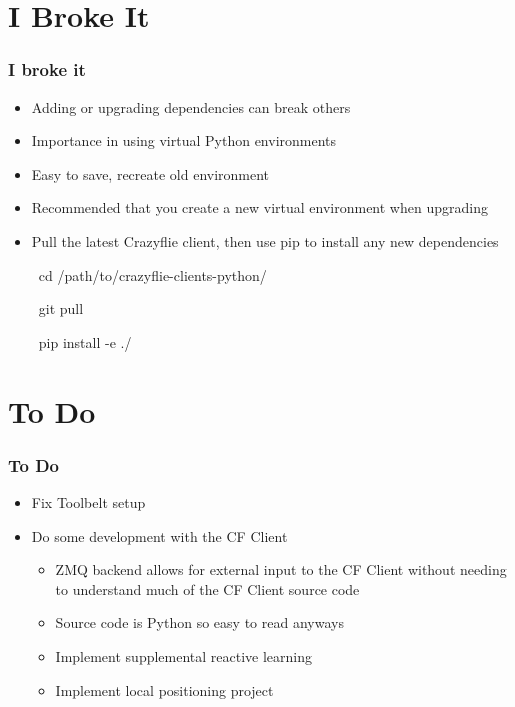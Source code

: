 \documentclass[t, xcolor=dvipsnames]{beamer} %
\begin{document}
\section{I Broke It}
\begin{frame}
	\frametitle{I broke it}
	\begin{itemize}
		\item Adding or upgrading dependencies can break others
		\item Importance in using virtual Python environments
		\item Easy to save, recreate old environment
		\item Recommended that you create a new virtual environment when upgrading
		\item Pull the latest Crazyflie client, then use pip to install any new dependencies
			\begin{semiverbatim}
			\ cd /path/to/crazyflie-clients-python/
			\end{semiverbatim}
			\begin{semiverbatim}
			\ git pull
			\end{semiverbatim}
			\begin{semiverbatim}
			\ pip install -e ./
			\end{semiverbatim}
      \end{itemize}
\end{frame}

\section{To Do}
\begin{frame}
	\frametitle{To Do}
	\begin{itemize}
		\item Fix Toolbelt setup
		\item Do some development with the CF Client
		\begin{itemize}
			\item ZMQ backend allows for external input to the CF Client without needing to understand much of the CF Client source code
			\item Source code is Python so easy to read anyways
			\item Implement supplemental reactive learning
			\item Implement local positioning project
		\end{itemize}
	\end{itemize}
\end{frame}
\end{document}
